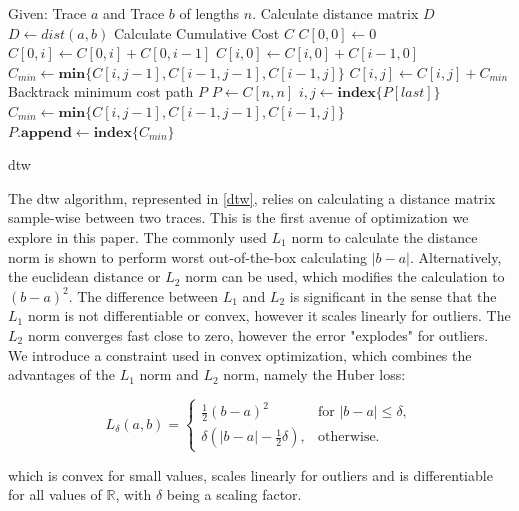 \begin{algorithm}
\begin{algorithmic}[1]
\State Given: Trace $a$ and Trace $b$ of lengths $n$.
\State Calculate distance matrix $D$
\State $D \gets dist(a,b)$
\State Calculate Cumulative Cost $C$
\State $C[0,0] \gets 0$
 
    \State $C[0,i] \gets C[0,i] + C[0,i-1]$
    \State $C[i,0] \gets C[i,0] + C[i-1,0]$
\EndFor
{} 
        \State $C_{min} \gets \textbf{min} \{C[i,j-1], C[i-1,j-1], C[i-1,j]\}$
        \State $C[i,j] \gets C[i,j] + C_{min}$
    \EndFor
\EndFor
\State Backtrack minimum cost path $P$
\State $P \gets C[n,n]$
    \State $i, j \gets \textbf{index} \{ P[last] \}$
    \State $C_{min} \gets \textbf{min} \{C[i,j-1], C[i-1,j-1], C[i-1,j]\}$
    \State $P.\textbf{append} \gets \textbf{index} \{ C_{min} \}$
\EndWhile
\State {}
\end{algorithmic}
\caption{\acl{dtw}} \label{dtw}
\end{algorithm}

The \ac{dtw} algorithm, represented in \cref{dtw}, relies on calculating a distance matrix sample-wise between two traces. This is the first avenue of optimization we explore in this paper. The commonly used $L_1$ norm to calculate the distance norm is shown to perform worst out-of-the-box calculating $|b-a|$. Alternatively, the euclidean distance or $L_2$ norm can be used, which modifies the calculation to $(b-a)^2$. The difference between $L_1$ and $L_2$ is significant in the sense that the $L_1$ norm is not differentiable or convex, however it scales linearly for outliers. The $L_2$ norm converges fast close to zero, however the error "explodes" for outliers. We introduce a constraint used in convex optimization, which combines the advantages of the $L_1$ norm and $L_2$ norm, namely the Huber loss:

\begin{equation}
L_\delta (a, b) = 
\begin{cases}
 \frac{1}{2} (b-a)^2 & \text{for } |b-a| \le \delta, \\
 \delta (|b-a| - \frac{1}{2} \delta), & \text{otherwise.}
\end{cases}
\label{eq:huber}
\end{equation}

which is convex for small values, scales linearly for outliers and is differentiable for all values of $\mathbb{R}$, with $\delta$ being a scaling factor.

